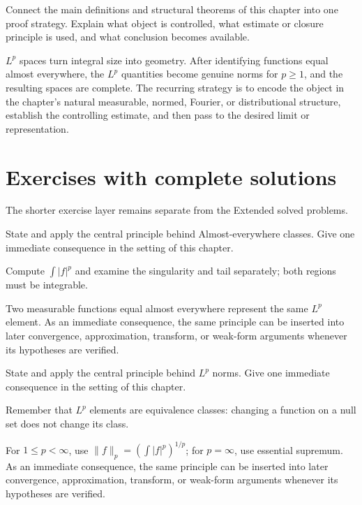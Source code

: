 \begin{problem}\label{prob:iii06-problem-12}
Connect the main definitions and structural theorems of this chapter into one proof strategy. Explain what object is controlled, what estimate or closure principle is used, and what conclusion becomes available.
\end{problem}
\begin{solution}
$L^p$ spaces turn integral size into geometry. After identifying functions equal almost everywhere, the $L^p$ quantities become genuine norms for $p\ge1$, and the resulting spaces are complete. The recurring strategy is to encode the object in the chapter's natural measurable, normed, Fourier, or distributional structure, establish the controlling estimate, and then pass to the desired limit or representation.
\end{solution}
\section{Exercises with complete solutions}
The shorter exercise layer remains separate from the Extended solved problems.

\begin{exercise}\label{exr:iii06-01}
State and apply the central principle behind Almost-everywhere classes. Give one immediate consequence in the setting of this chapter.
\end{exercise}
\begin{hint}
Compute \(\int |f|^p\) and examine the singularity and tail separately; both regions must be integrable.
\end{hint}
\begin{solution}
Two measurable functions equal almost everywhere represent the same $L^p$ element. As an immediate consequence, the same principle can be inserted into later convergence, approximation, transform, or weak-form arguments whenever its hypotheses are verified.
\end{solution}

\begin{exercise}\label{exr:iii06-02}
State and apply the central principle behind $L^p$ norms. Give one immediate consequence in the setting of this chapter.
\end{exercise}
\begin{hint}
Remember that \(L^p\) elements are equivalence classes: changing a function on a null set does not change its class.
\end{hint}
\begin{solution}
For $1\le p<\infty$, use $\|f\|_p=(\int|f|^p)^{1/p}$; for $p=\infty$, use essential supremum. As an immediate consequence, the same principle can be inserted into later convergence, approximation, transform, or weak-form arguments whenever its hypotheses are verified.
\end{solution}

